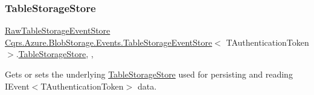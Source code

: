 \subsubsection{\texorpdfstring{Table\+Storage\+Store}{TableStorageStore}}
{\footnotesize\ttfamily \hyperlink{classCqrs_1_1Azure_1_1BlobStorage_1_1Events_1_1TableStorageEventStore_1_1RawTableStorageEventStore}{Raw\+Table\+Storage\+Event\+Store} \hyperlink{classCqrs_1_1Azure_1_1BlobStorage_1_1Events_1_1TableStorageEventStore}{Cqrs.\+Azure.\+Blob\+Storage.\+Events.\+Table\+Storage\+Event\+Store}$<$ T\+Authentication\+Token $>$.\hyperlink{classCqrs_1_1Azure_1_1BlobStorage_1_1TableStorageStore}{Table\+Storage\+Store}\hspace{0.3cm}{\ttfamily [get]}, {\ttfamily [set]}, {\ttfamily [protected]}}



Gets or sets the underlying \hyperlink{classCqrs_1_1Azure_1_1BlobStorage_1_1TableStorageStore}{Table\+Storage\+Store} used for persisting and reading I\+Event$<$\+T\+Authentication\+Token$>$ data. 

